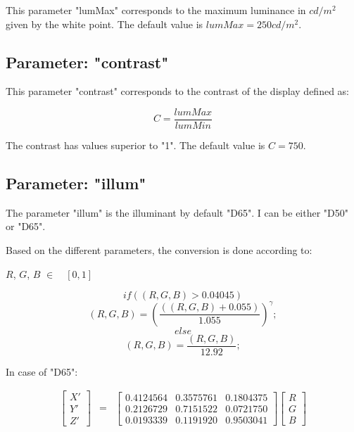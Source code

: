 This parameter "lumMax" corresponds to the maximum luminance in $cd/m^2$ given by the white point. The default value is $lumMax = 250cd/m^2$.

\subsection{Parameter: "contrast"}

This parameter "contrast" corresponds to the contrast of the display defined as:

\begin{equation}
C = \frac{lumMax}{lumMin}
\end{equation}

The contrast has values superior to "1". The default value is $C=750$.

\subsection{Parameter: "illum"}

The parameter "illum" is the illuminant by default 	"D65". I can be either "D50" or "D65".

Based on the different parameters, the conversion is done according to:

$R$, $G$, $B$ $\in\quad[0,1]$

\begin{displaymath}
	if((R,G,B) > 0.04045)
\end{displaymath}
\begin{displaymath}
		(R,G,B) = (\frac{((R,G,B) + 0.055)}{1.055})^{\gamma};
\end{displaymath}
\begin{displaymath}
	else
\end{displaymath}
\begin{displaymath}
		(R,G,B) =  \frac{(R,G,B)}{12.92};
\end{displaymath}
	
In case of "D65":
	
\begin{eqnarray}
	\begin{bmatrix}	X' \\ Y' \\ Z' \end{bmatrix} 
	&=& \begin{bmatrix} 0.4124564 &  0.3575761 &  0.1804375 \\  0.2126729 & 0.7151522 & 0.0721750 \\ 0.0193339 &  0.1191920 & 0.9503041 \end{bmatrix} 
	\begin{bmatrix}	R \\ G \\ B \end{bmatrix}
	\label{eqmat1}
\end{eqnarray}

